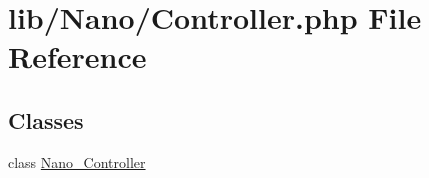 \hypertarget{Controller_8php}{
\section{lib/Nano/Controller.php File Reference}
\label{Controller_8php}
}
\subsection*{Classes}
\begin{CompactItemize}
\item 
class \hyperlink{classNano__Controller}{Nano\_\-Controller}
\end{CompactItemize}
